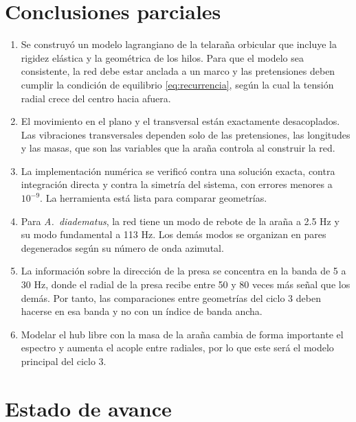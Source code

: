 \documentclass[11pt,letterpaper]{article}
\begin{document}
\section{Conclusiones parciales}\label{sec:conclusiones}

\begin{enumerate}
    \item Se construyó un modelo lagrangiano de la telaraña orbicular que
    incluye la rigidez elástica y la geométrica de los hilos. Para que el
    modelo sea consistente, la red debe estar anclada a un marco y las
    pretensiones deben cumplir la condición de equilibrio
    \eqref{eq:recurrencia}, según la cual la tensión radial crece del centro
    hacia afuera.
    \item El movimiento en el plano y el transversal están exactamente
    desacoplados. Las vibraciones transversales dependen solo de las
    pretensiones, las longitudes y las masas, que son las variables que la
    araña controla al construir la red.
    \item La implementación numérica se verificó contra una solución exacta,
    contra integración directa y contra la simetría del sistema, con errores
    menores a $10^{-9}$. La herramienta está lista para comparar geometrías.
    \item Para \textit{A.~diadematus}, la red tiene un modo de rebote de la
    araña a 2.5 Hz y su modo fundamental a 113 Hz. Los demás modos se
    organizan en pares degenerados según su número de onda azimutal.
    \item La información sobre la dirección de la presa se concentra en la
    banda de 5 a 30 Hz, donde el radial de la presa recibe entre 50 y 80
    veces más señal que los demás. Por tanto, las comparaciones entre
    geometrías del ciclo 3 deben hacerse en esa banda y no con un índice de
    banda ancha.
    \item Modelar el hub libre con la masa de la araña cambia de forma
    importante el espectro y aumenta el acople entre radiales, por lo que
    este será el modelo principal del ciclo 3.
\end{enumerate}

\section{Estado de avance}\label{sec:avance}
\end{document}
